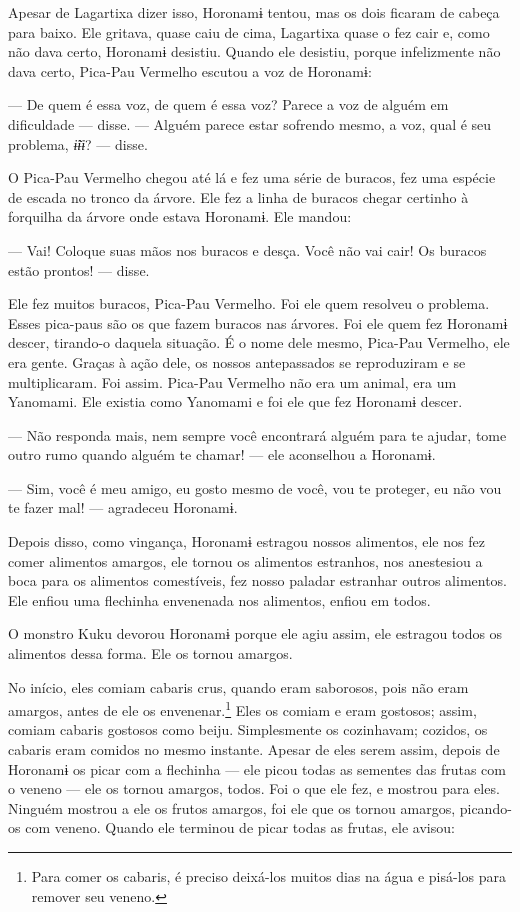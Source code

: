 Apesar de Lagartixa dizer isso, Horonamɨ tentou, mas os dois ficaram de
cabeça para baixo. Ele gritava, quase caiu de cima, Lagartixa quase o
fez cair e, como não dava certo, Horonamɨ desistiu. Quando ele desistiu,
porque infelizmente não dava certo, Pica-Pau Vermelho escutou a voz de
Horonamɨ: 

--- De quem é essa voz, de quem é essa voz? Parece a voz de alguém em
dificuldade --- disse. --- Alguém parece estar sofrendo mesmo, a voz,
qual é seu problema, \textit{ɨ̃ɨɨ}? --- disse. 

O Pica-Pau Vermelho chegou até lá e fez uma série de buracos, fez uma
espécie de escada no tronco da árvore. Ele fez a linha de buracos chegar
certinho à forquilha da árvore onde estava Horonamɨ. Ele mandou: 

--- Vai! Coloque suas mãos nos buracos e desça. Você não vai cair! Os
buracos estão prontos! --- disse. 

Ele fez muitos buracos, Pica-Pau Vermelho. Foi ele quem resolveu o
problema. Esses pica-paus são os que fazem buracos nas árvores. Foi ele
quem fez Horonamɨ descer, tirando-o daquela situação. É o nome dele
mesmo, Pica-Pau Vermelho, ele era gente. Graças à ação dele, os nossos 
antepassados se reproduziram e se multiplicaram. Foi assim. Pica-Pau Vermelho 
não era um animal, era um Yanomami. Ele existia como Yanomami e foi ele que fez Horonamɨ descer. 

--- Não responda mais, nem sempre você encontrará alguém para te
ajudar, tome outro rumo quando alguém te chamar! --- ele aconselhou a
Horonamɨ. 

--- Sim, você é meu amigo, eu gosto mesmo de você, vou te proteger, eu
não vou te fazer mal! --- agradeceu Horonamɨ. 

Depois disso, como vingança, Horonamɨ estragou nossos alimentos, ele nos
fez comer alimentos amargos, ele tornou os alimentos estranhos, nos
anestesiou a boca para os alimentos comestíveis, fez nosso paladar
estranhar outros alimentos. Ele enfiou uma flechinha envenenada nos
alimentos, enfiou em todos. 

O monstro Kuku devorou Horonamɨ porque ele agiu assim, ele
estragou todos os alimentos dessa forma. Ele os tornou amargos. 

No início, eles comiam cabaris crus, quando eram saborosos, pois não
eram amargos, antes de ele os envenenar.\footnote{Para comer os cabaris, é 
preciso deixá-los muitos dias na água e pisá-los para remover seu 
veneno.} Eles os comiam e eram gostosos; assim, comiam cabaris gostosos como beiju. Simplesmente os cozinhavam;
cozidos, os cabaris eram comidos no mesmo instante. Apesar de eles serem
assim, depois de Horonamɨ os picar com a flechinha --- ele picou todas
as sementes das frutas com o veneno --- ele os tornou amargos, todos.
Foi o que ele fez, e mostrou para eles. Ninguém mostrou a ele os frutos
amargos, foi ele que os tornou amargos, picando-os com veneno. Quando
ele terminou de picar todas as frutas, ele avisou: 

